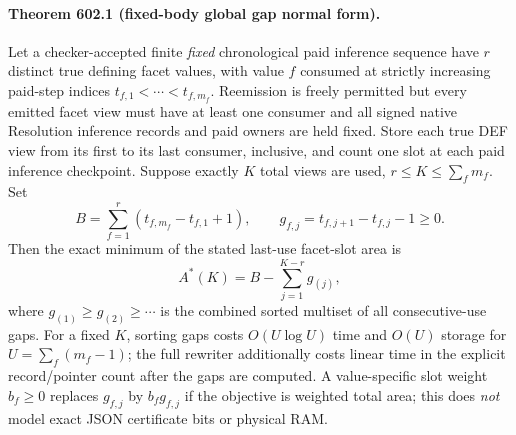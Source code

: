\paragraph{Theorem 602.1 (fixed-body global gap normal form).}
Let a checker-accepted finite \emph{fixed} chronological paid inference sequence have $r$ distinct true defining facet values, with value $f$ consumed at strictly increasing paid-step indices $t_{f,1}<\cdots<t_{f,m_f}$. Reemission is freely permitted but every emitted facet view must have at least one consumer and all signed native Resolution inference records and paid owners are held fixed. Store each true DEF view from its first to its last consumer, inclusive, and count one slot at each paid inference checkpoint. Suppose exactly $K$ total views are used, $r\le K\le\sum_fm_f$. Set
\[
 B=\sum_{f=1}^r(t_{f,m_f}-t_{f,1}+1),\qquad
 g_{f,j}=t_{f,j+1}-t_{f,j}-1\ge0.
\]
Then the exact minimum of the stated last-use facet-slot area is
\[
 \boxed{A^*(K)=B-\sum_{j=1}^{K-r}g_{(j)},}
\]
where $g_{(1)}\ge g_{(2)}\ge\cdots$ is the combined sorted multiset of all consecutive-use gaps. For a fixed $K$, sorting gaps costs $O(U\log U)$ time and $O(U)$ storage for $U=\sum_f(m_f-1)$; the full rewriter additionally costs linear time in the explicit record/pointer count after the gaps are computed. A value-specific slot weight $b_f\ge0$ replaces $g_{f,j}$ by $b_fg_{f,j}$ if the objective is weighted total area; this does \emph{not} model exact JSON certificate bits or physical RAM.

